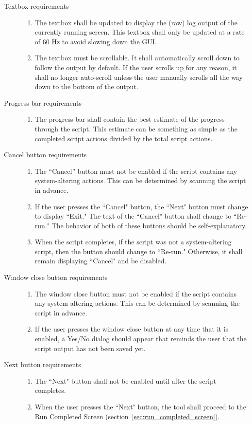\begin{description}
\item[Textbox requirements] \hfill 
\begin{enumerate}
  \item The textbox shall be updated to display the (raw) log output of the
  currently running screen.  This textbox shall only be updated at a rate of 60
  Hz to avoid slowing down the GUI.
  \item The textbox must be scrollable.  It shall automatically scroll down to 
  follow the output by default.  If the user scrolls up for any reason, it shall
  no longer auto-scroll unless the user manually scrolls all the way down to the
  bottom of the output.
\end{enumerate}
\item[Progress bar requirements] \hfill 
\begin{enumerate}
  \item The progress bar shall contain the best estimate of the progress through
  the script.  This estimate can be something as simple as the completed script 
  actions divided by the total script actions.
\end{enumerate}
\item[Cancel button requirements] \hfill 
\begin{enumerate}
  \item The ``Cancel'' button must not be enabled if the script contains any 
  system-altering actions.  This can be determined by scanning the script in 
  advance.
  \item If the user presses the ``Cancel" button, the ``Next" button must  
  change to display ``Exit."  The text of the ``Cancel" button shall change to
  ``Re-run."  The behavior of both of these buttons should be self-explanatory.
  \item When the script completes, if the script was not a system-altering
  script, then the button should change to ``Re-run."  Otherwise, it shall
  remain displaying ``Cancel" and be disabled.
\end{enumerate}
\item[Window close button requirements] \hfill 
\begin{enumerate}
  \item The window close button must not be enabled if the script contains any 
  system-altering actions.  This can be determined by scanning the script in
  advance.
  \item If the user presses the window close button at any time that it is
  enabled, a Yes/No dialog should appear that reminds the user that the script
  output has not been saved yet.
\end{enumerate}
\item[Next button requirements] \hfill 
\begin{enumerate}
  \item The ``Next" button shall not be enabled until after the script 
  completes.
  \item When the user presses the ``Next" button, the tool shall proceed to the
  Run Completed Screen (section~\ref{sec:run_completed_screen}).
\end{enumerate}
\end{description}

